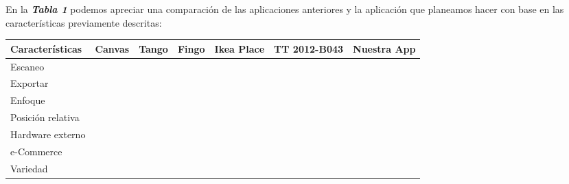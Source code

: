 En la \textbf{\textit{Tabla 1}} podemos apreciar una comparación de las aplicaciones anteriores y la aplicación que planeamos hacer con base en las características previamente descritas:\par

\begin{table}[h]
	\centering
	\begin{tabular}{|p{3.2cm}|c|c|c|c|p{2.5cm}|c|}
		\textbf{Características}              & \textbf{Canvas}                   & \textbf{Tango}                    & \textbf{Fingo}                    & \textbf{Ikea Place}               & \textbf{TT 2012-B043}            & \textbf{Nuestra App}               \\\hline
		Escaneo                      & \cellcolor[HTML]{BFBFBF} &                          & \cellcolor[HTML]{BFBFBF} &                          & \cellcolor[HTML]{BFBFBF} & \cellcolor[HTML]{BFBFBF} \\\hline
		Exportar                     & \cellcolor[HTML]{BFBFBF} &                          &                          &                          &                          &                          \\\hline
		Enfoque                      &                          & \cellcolor[HTML]{BFBFBF} &                          & \cellcolor[HTML]{BFBFBF} & \cellcolor[HTML]{BFBFBF} & \cellcolor[HTML]{BFBFBF} \\\hline
		Posición relativa            &                          & \cellcolor[HTML]{BFBFBF} &                          & \cellcolor[HTML]{BFBFBF} &                          & \cellcolor[HTML]{BFBFBF} \\\hline
		Hardware externo             & \cellcolor[HTML]{BFBFBF} &                          & \cellcolor[HTML]{BFBFBF} & \cellcolor[HTML]{BFBFBF} & \cellcolor[HTML]{BFBFBF} &                          \\\hline
		e-Commerce                   &                          &                          &                          &                          &                          & \cellcolor[HTML]{BFBFBF} \\\hline
		Variedad                     &                          &                          & \cellcolor[HTML]{BFBFBF} &                          & \cellcolor[HTML]{BFBFBF} & \cellcolor[HTML]{BFBFBF} \\\hline

\end{tabular}
\end{table}
